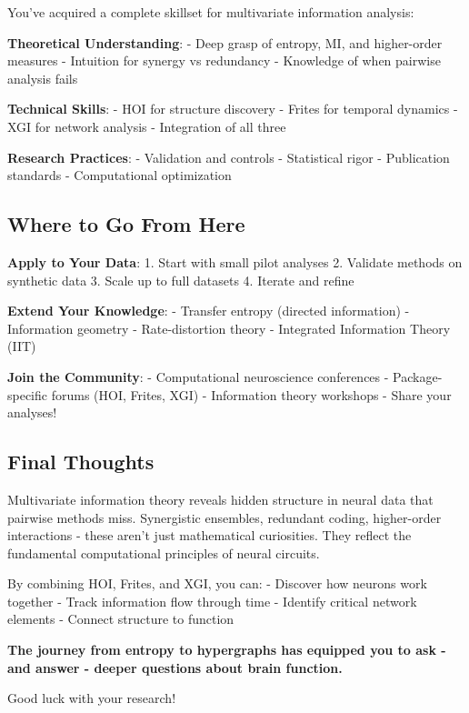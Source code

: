 \documentclass[
  11pt,
  letterpaper,
  oneside,
  openany]{book}
\begin{document}
You've acquired a complete skillset for multivariate information
analysis:

\textbf{Theoretical Understanding}: - Deep grasp of entropy, MI, and
higher-order measures - Intuition for synergy vs redundancy - Knowledge
of when pairwise analysis fails

\textbf{Technical Skills}: - HOI for structure discovery - Frites for
temporal dynamics - XGI for network analysis - Integration of all three

\textbf{Research Practices}: - Validation and controls - Statistical
rigor - Publication standards - Computational optimization

\subsection{Where to Go From Here}\label{where-to-go-from-here}

\textbf{Apply to Your Data}: 1. Start with small pilot analyses 2.
Validate methods on synthetic data 3. Scale up to full datasets 4.
Iterate and refine

\textbf{Extend Your Knowledge}: - Transfer entropy (directed
information) - Information geometry - Rate-distortion theory -
Integrated Information Theory (IIT)

\textbf{Join the Community}: - Computational neuroscience conferences -
Package-specific forums (HOI, Frites, XGI) - Information theory
workshops - Share your analyses!

\subsection{Final Thoughts}\label{final-thoughts}

Multivariate information theory reveals hidden structure in neural data
that pairwise methods miss. Synergistic ensembles, redundant coding,
higher-order interactions - these aren't just mathematical curiosities.
They reflect the fundamental computational principles of neural
circuits.

By combining HOI, Frites, and XGI, you can: - Discover how neurons work
together - Track information flow through time - Identify critical
network elements - Connect structure to function

\textbf{The journey from entropy to hypergraphs has equipped you to ask
- and answer - deeper questions about brain function.}

Good luck with your research! 🧠✨🚀
\end{document}
